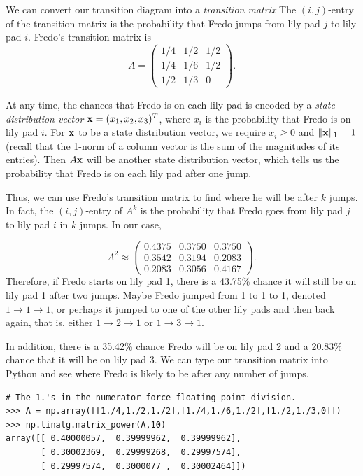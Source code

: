 We can convert our transition diagram into a \emph{transition matrix} The $(i,j)$-entry of the transition matrix is the probability that Fredo jumps from lily pad $j$ to lily pad $i$.
Fredo's transition matrix is
\[
A = \begin{pmatrix}
1/4 & 1/2 & 1/2\\
1/4 & 1/6 & 1/2\\
1/2 & 1/3 & 0
\end{pmatrix}.
\]

At any time, the chances that Fredo is on each lily pad is encoded by a \emph{state distribution vector} ${\bf x} = (x_1, x_2, x_3)^T$, where $x_i$ is the probability that Fredo is on lily pad $i$. 
For ${\bf x}$ to be a state distribution vector, we require $x_i\geq 0$ and $\|{\bf x}\|_1=1$ (recall that the 1-norm of a column vector is the sum of the magnitudes of its entries). 
Then $A{\bf x}$ will be another state distribution vector, which tells us the probability that Fredo is on each lily pad after one jump.

Thus, we can use Fredo's transition matrix to find where he will be after $k$ jumps. In fact, the $(i,j)$-entry of $A^k$ is the probability that Fredo goes from lily pad $j$ to lily pad $i$ in $k$ jumps. 
In our case,

\[
A^2 \approx \begin{pmatrix}
0.4375 & 0.3750 & 0.3750\\
0.3542 & 0.3194 & 0.2083\\
0.2083 & 0.3056 & 0.4167
\end{pmatrix}.
\]
Therefore, if Fredo starts on lily pad 1, there is a 43.75\% chance it will still be on lily pad 1 after two jumps.
Maybe Fredo jumped from 1 to 1 to 1, denoted $1 \rightarrow 1 \rightarrow 1$, or perhaps it jumped to one of the other lily pads and then back again, that is, either $1 \rightarrow 2 \rightarrow 1$ or $1 \rightarrow 3 \rightarrow 1$.

In addition, there is a 35.42\% chance Fredo will be on lily pad 2 and a 20.83\% chance that it will be on lily pad 3.
We can type our transition matrix into Python and see where Fredo is likely to be after any number of jumps.

\begin{lstlisting}
# The 1.'s in the numerator force floating point division.
>>> A = np.array([[1./4,1./2,1./2],[1./4,1./6,1./2],[1./2,1./3,0]])
>>> np.linalg.matrix_power(A,10)
array([[ 0.40000057,  0.39999962,  0.39999962],
       [ 0.30002369,  0.29999268,  0.29997574],
       [ 0.29997574,  0.3000077 ,  0.30002464]])
\end{lstlisting}

